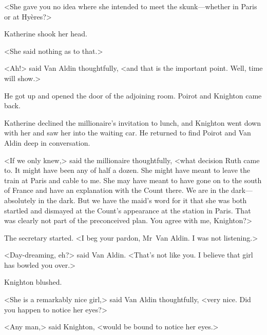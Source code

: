 <She gave you no idea where she intended to meet the skunk—whether in Paris or at Hyères?>

Katherine shook her head.

<She said nothing as to that.>

<Ah!> said Van Aldin thoughtfully, <and that is the important point. Well, time will show.>

He got up and opened the door of the adjoining room. Poirot and Knighton came back.

Katherine declined the millionaire's invitation to lunch, and Knighton went down with her and saw her into the waiting car. He returned to find Poirot and Van Aldin deep in conversation.

<If we only knew,> said the millionaire thoughtfully, <what decision Ruth came to. It might have been any of half a dozen. She might have meant to leave the train at Paris and cable to me. She may have meant to have gone on to the south of France and have an explanation with the Count there. We are in the dark—absolutely in the dark. But we have the maid's word for it that she was both startled and dismayed at the Count's appearance at the station in Paris. That was clearly not part of the preconceived plan. You agree with me, Knighton?>

The secretary started. <I beg your pardon, Mr~Van Aldin. I was not listening.>

<Day-dreaming, eh?> said Van Aldin. <That's not like you. I believe that girl has bowled you over.>

Knighton blushed.

<She is a remarkably nice girl,> said Van Aldin thoughtfully, <very nice. Did you happen to notice her eyes?>

<Any man,> said Knighton, <would be bound to notice her eyes.>